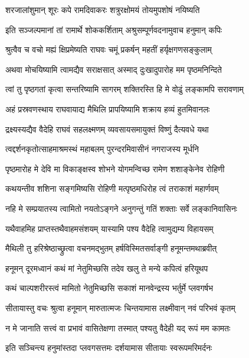 \twolineshloka
{शरजालांशुमान् शूरः कपे रामदिवाकरः}
{शत्रुरक्षोमयं तोयमुपशोषं नयिष्यति} %

\twolineshloka
{इति सञ्जल्पमानां तां रामार्थे शोककर्शिताम्}
{अश्रुसम्पूर्णवदनामुवाच हनुमान् कपिः} %

\twolineshloka
{श्रुत्वैव च वचो मह्यं क्षिप्रमेष्यति राघवः}
{चमूं प्रकर्षन् महतीं हर्यृक्षगणसङ्कुलाम्} %

\twolineshloka
{अथवा मोचयिष्यामि त्वामद्यैव सराक्षसात्}
{अस्माद् दुःखादुपारोह मम पृष्ठमनिन्दिते} %

\twolineshloka
{त्वां तु पृष्ठगतां कृत्वा सन्तरिष्यामि सागरम्}
{शक्तिरस्ति हि मे वोढुं लङ्कामपि सरावणाम्} %

\twolineshloka
{अहं प्रस्रवणस्थाय राघवायाद्य मैथिलि}
{प्रापयिष्यामि शक्राय हव्यं हुतमिवानलः} %

\twolineshloka
{द्रक्ष्यस्यद्यैव वैदेहि राघवं सहलक्ष्मणम्}
{व्यवसायसमायुक्तं विष्णुं दैत्यवधे यथा} %

\twolineshloka
{त्वद्दर्शनकृतोत्साहमाश्रमस्थं महाबलम्}
{पुरन्दरमिवासीनं नगराजस्य मूर्धनि} %

\twolineshloka
{पृष्ठमारोह मे देवि मा विकाङ्क्षस्व शोभने}
{योगमन्विच्छ रामेण शशाङ्केनेव रोहिणी} %

\twolineshloka
{कथयन्तीव शशिना सङ्गमिष्यसि रोहिणी}
{मत्पृष्ठमधिरोह त्वं तराकाशं महार्णवम्} %

\twolineshloka
{नहि मे सम्प्रयातस्य त्वामितो नयतोऽङ्गने}
{अनुगन्तुं गतिं शक्ताः सर्वे लङ्कानिवासिनः} %

\twolineshloka
{यथैवाहमिह प्राप्तस्तथैवाहमसंशयम्}
{यास्यामि पश्य वैदेहि त्वामुद्यम्य विहायसम्} %

\twolineshloka
{मैथिली तु हरिश्रेष्ठाच्छ्रुत्वा वचनमद्भुतम्}
{हर्षविस्मितसर्वाङ्गी हनूमन्तमथाब्रवीत्} %

\twolineshloka
{हनूमन् दूरमध्वानं कथं मां नेतुमिच्छसि}
{तदेव खलु ते मन्ये कपित्वं हरियूथप} %

\twolineshloka
{कथं चाल्पशरीरस्त्वं मामितो नेतुमिच्छसि}
{सकाशं मानवेन्द्रस्य भर्तुर्मे प्लवगर्षभ} %

\twolineshloka
{सीतायास्तु वचः श्रुत्वा हनूमान् मारुतात्मजः}
{चिन्तयामास लक्ष्मीवान् नवं परिभवं कृतम्} %

\twolineshloka
{न मे जानाति सत्त्वं वा प्रभावं वासितेक्षणा}
{तस्मात् पश्यतु वैदेही यद् रूपं मम कामतः} %

\twolineshloka
{इति सञ्चिन्त्य हनुमांस्तदा प्लवगसत्तमः}
{दर्शयामास सीतायाः स्वरूपमरिमर्दनः} %

